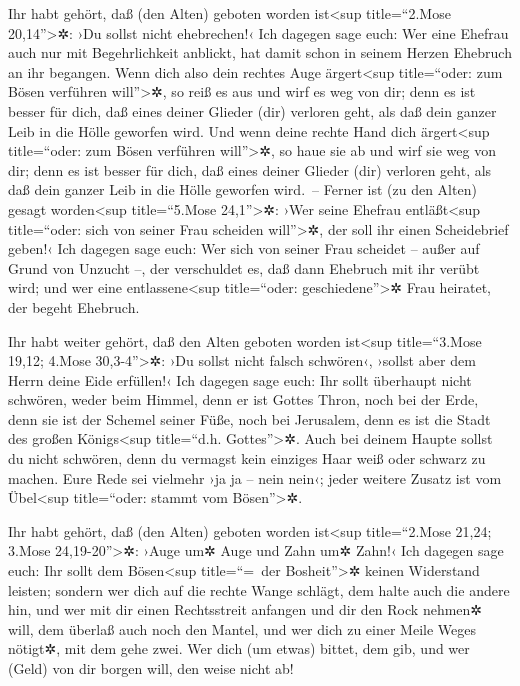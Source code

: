  Ihr habt gehört, daß (den Alten) geboten worden
ist\textless sup title=``2.Mose 20,14''\textgreater✲: ›Du sollst nicht
ehebrechen!‹  Ich dagegen sage euch: Wer eine Ehefrau
auch nur mit Begehrlichkeit anblickt, hat damit schon in seinem Herzen
Ehebruch an ihr begangen.  Wenn dich also dein rechtes
Auge ärgert\textless sup title=``oder: zum Bösen verführen
will''\textgreater✲, so reiß es aus und wirf es weg von dir; denn es ist
besser für dich, daß eines deiner Glieder (dir) verloren geht, als daß
dein ganzer Leib in die Hölle geworfen wird.  Und wenn
deine rechte Hand dich ärgert\textless sup title=``oder: zum Bösen
verführen will''\textgreater✲, so haue sie ab und wirf sie weg von dir;
denn es ist besser für dich, daß eines deiner Glieder (dir) verloren
geht, als daß dein ganzer Leib in die Hölle geworfen wird.~--
 Ferner ist (zu den Alten) gesagt worden\textless sup
title=``5.Mose 24,1''\textgreater✲: ›Wer seine Ehefrau
entläßt\textless sup title=``oder: sich von seiner Frau scheiden
will''\textgreater✲, der soll ihr einen Scheidebrief geben!‹
 Ich dagegen sage euch: Wer sich von seiner Frau scheidet
-- außer auf Grund von Unzucht --, der verschuldet es, daß dann Ehebruch
mit ihr verübt wird; und wer eine entlassene\textless sup title=``oder:
geschiedene''\textgreater✲ Frau heiratet, der begeht Ehebruch.

 Ihr habt weiter gehört, daß den Alten geboten worden
ist\textless sup title=``3.Mose 19,12; 4.Mose 30,3-4''\textgreater✲: ›Du
sollst nicht falsch schwören‹, ›sollst aber dem Herrn deine Eide
erfüllen!‹  Ich dagegen sage euch: Ihr sollt überhaupt
nicht schwören, weder beim Himmel, denn er ist Gottes Thron,
 noch bei der Erde, denn sie ist der Schemel seiner Füße,
noch bei Jerusalem, denn es ist die Stadt des großen Königs\textless sup
title=``d.h. Gottes''\textgreater✲.  Auch bei deinem
Haupte sollst du nicht schwören, denn du vermagst kein einziges Haar
weiß oder schwarz zu machen.  Eure Rede sei vielmehr ›ja
ja -- nein nein‹; jeder weitere Zusatz ist vom Übel\textless sup
title=``oder: stammt vom Bösen''\textgreater✲.

 Ihr habt gehört, daß (den Alten) geboten worden
ist\textless sup title=``2.Mose 21,24; 3.Mose 24,19-20''\textgreater✲:
›Auge um✲ Auge und Zahn um✲ Zahn!‹  Ich dagegen sage
euch: Ihr sollt dem Bösen\textless sup title=``=~der
Bosheit''\textgreater✲ keinen Widerstand leisten; sondern wer dich auf
die rechte Wange schlägt, dem halte auch die andere hin, 
und wer mit dir einen Rechtsstreit anfangen und dir den Rock nehmen✲
will, dem überlaß auch noch den Mantel,  und wer dich zu
einer Meile Weges nötigt✲, mit dem gehe zwei.  Wer dich
(um etwas) bittet, dem gib, und wer (Geld) von dir borgen will, den
weise nicht ab!

